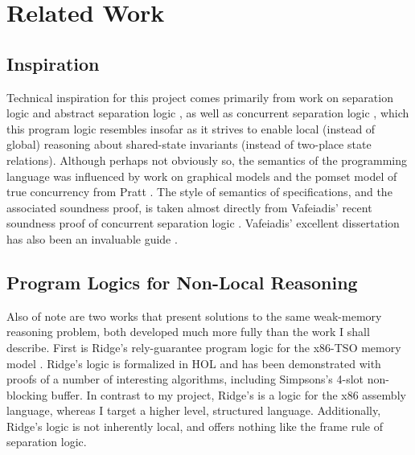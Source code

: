 \documentclass[11pt]{report}
\begin{document}
\chapter{Related Work}

\section{Inspiration}

Technical inspiration for this project comes primarily from work on separation logic \cite{DBLP:conf/lics/Reynolds02,DBLP:conf/csl/OHearnRY01,DBLP:journals/bsl/OHearnP99} and abstract separation logic \cite{DBLP:conf/lics/CalcagnoOY07}, as well as concurrent separation logic  \cite{DBLP:journals/tcs/OHearn07,DBLP:journals/tcs/Brookes07}, which this program logic resembles insofar as it strives to enable local (instead of global) reasoning about shared-state invariants (instead of two-place state relations). Although perhaps not obviously so, the semantics of the programming language was influenced by work on graphical models \cite{DBLP:journals/ipl/WehrmanHO09,DBLP:conf/RelMiCS/HoareMSW09,DBLP:journals/jlp/HoareMSW11} and the pomset model of true concurrency from Pratt \cite{DBLP:conf/popl/Pratt82,DBLP:conf/concur/Pratt84}. The style of semantics of specifications, and the associated soundness proof, is taken almost directly from Vafeiadis' recent soundness proof of concurrent separation logic \cite{V11}. Vafeiadis' excellent dissertation has also been an invaluable guide \cite{VafeiadisDissertation}. 

\section{Program Logics for Non-Local Reasoning}

Also of note are two works that present solutions to the same weak-memory reasoning problem, both developed much more fully than the work I shall describe. First is Ridge's rely-guarantee program logic for the x86-TSO memory model \cite{DBLP:conf/vstte/Ridge10}. Ridge's logic is formalized in HOL and has been demonstrated with proofs of a number of interesting algorithms, including Simpsons's 4-slot non-blocking buffer. In contrast to my project, Ridge's is a logic for the x86 assembly language, whereas I target a higher level, structured language. Additionally, Ridge's logic is not inherently local, and offers nothing like the frame rule of separation logic. 
\end{document}
